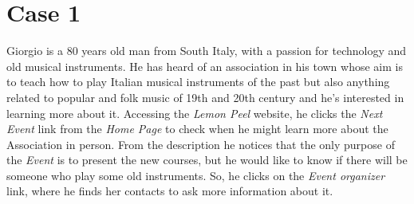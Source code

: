 \documentclass[../../DD.tex]{subfiles}
\begin{document}
\section{Case 1 \label{sect:4.1}}

	    Giorgio is a 80 years old man from South Italy, with a passion for technology and old musical instruments. He has heard of an association in his town whose aim is to teach how to play Italian musical instruments of the past but also anything related to popular and folk music of 19th and 20th century and he's interested in learning more about it.
	\newline Accessing the \textit{Lemon Peel} website, he clicks the \textit{Next Event} link from the \textit{Home Page} to check when he might learn more about the Association in person. From the description he notices that the only purpose of the \textit{Event} is to present the new courses, but he would like to know if there will be someone who play some old instruments. So, he clicks on the \textit{Event organizer} link, where he finds her contacts to ask more information about it.
	
\end{document}
